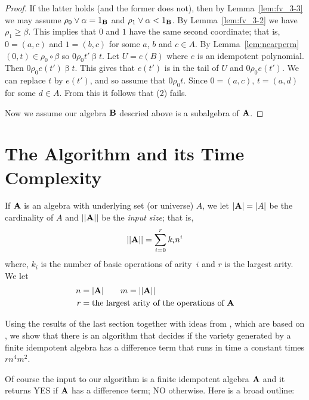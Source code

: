 \begin{proof}
If the latter holds (and the former does not), then
by Lemma~\ref{lem:fv_3-3} we may 
assume $\rho_0 \join \alpha = 1_{\alg B}$ and
$\rho_1 \join \alpha < 1_{\alg B}$. By Lemma~\ref{lem:fv_3-2}
we have $\rho_1 \ge \beta$.
This implies that $0$ and $1$ have the same second coordinate; that is,
$0 = (a,c)$ and $1 = (b,c)$ for some $a$, $b$ and $c\in A$.
By Lemma~\ref{lem:nearperm} $(0,t) \in \rho_0 \circ \beta$
so $0 \mathrel {\rho_0} t' \mathrel{\beta} t$. Let $U = e(B)$
where $e$ is an idempotent polynomial. Then
$0 \mathrel {\rho_0} e(t') \mathrel{\beta} t$. This gives
that $e(t')$ is in the tail of $U$ and 
$0 \mathrel{\rho_0} e(t')$. We can
replace $t$ by $e(t')$, and so assume that 
$0 \mathrel{\rho_0} t$.
Since $0 = (a,c)$, $t = (a,d)$ for some $d\in A$. From this
it follows that (2) fails.

Now we assume our algebra $\mathbf{B}$ descried above is a subalgebra
of $\mathbf{A}$. 


\end{proof}









\section{The Algorithm and its Time Complexity}

If $\mathbf{A}$ is an algebra with underlying set (or universe) $A$,
we let $|\mathbf{A}| = |A|$ be the cardinality of
$A$ and $||\mathbf{A}||$ be the \emph{input size}; that is,
\[
||\mathbf{A}|| = \sum_{i=0}^r k_i n^i
\]
where, $k_i$ is the number of basic operations of arity~$i$ and $r$
is the largest arity. We let
\begin{align*}
n &= |\mathbf{A}|  \qquad m = ||\mathbf{A}|| \\
r &= \text{the largest arity of the operations of $\mathbf{A}$}
\end{align*}

Using the results of the last section together with ideas from
\cite{Freese:2009},
which are based on \cite{KearnesKiss1999},
we show that there is an algorithm that decides if the variety 
generated by a finite idempotent
algebra has a difference term that
runs in time a constant times $rn^4m^2$.




Of course the input to our algorithm is a finite idempotent algebra $\mathbf{A}$
and it returns YES if $\mathbf{A}$ has a difference term; NO otherwise. Here is a 
broad outline:

